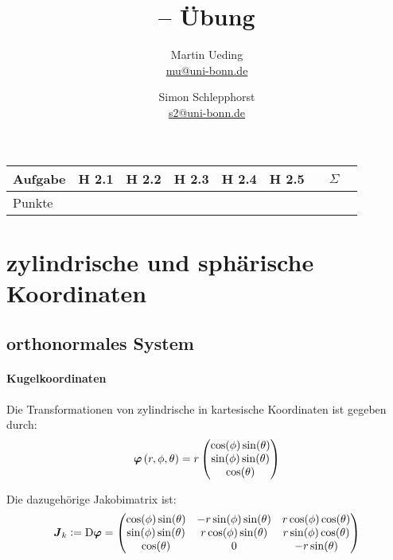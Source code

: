 \documentclass[11pt, ngerman]{article}
\title{\themodul{} -- Übung \theuebung \\ \vspace{0.5cm} \large{\thegruppe}}
\author{Martin Ueding \\ \small{\href{mailto:mu@uni-bonn.de}{mu@uni-bonn.de}} \and Simon Schlepphorst \\ \small{\href{mailto:s2@uni-bonn.de}{s2@uni-bonn.de}}}
\newcommand{\punkte}{\textcolor{white}{xxxxx}}
\newcommand{\tens}[1]{\boldsymbol{#1}}
\renewcommand{\vec}[1]{\boldsymbol{#1}}
\newcommand{\theuebung}{2}
\begin{document}
\maketitle

\begin{table}[h]
	\centering
	\begin{tabular}{l|c|c|c|c|c|c}
		Aufgabe & H \theuebung.1 & H \theuebung.2 & H \theuebung.3 & H \theuebung.4 & H \theuebung.5 & $\Sigma$   \\
		\hline
		Punkte & \punkte & \punkte & \punkte & \punkte & \punkte & \punkte
	\end{tabular}
\end{table}


\section{zylindrische und sphärische Koordinaten}

\subsection{orthonormales System}

\paragraph{Kugelkoordinaten}

Die Transformationen von zylindrische in kartesische Koordinaten ist gegeben durch:
\[
	\vec\varphi\del{r, \phi, \theta} = r \begin{pmatrix}
		\cos(\phi) \sin(\theta) \\
		\sin(\phi) \sin(\theta) \\
		\cos(\theta)
	\end{pmatrix}
\]

Die dazugehörige Jakobimatrix ist:
\[
	\tens J_k := \Dif \vec\varphi = \begin{pmatrix}
		\cos(\phi) \sin(\theta) & -r \sin(\phi)\sin(\theta) & r \cos(\phi) \cos(\theta) \\
		\sin(\phi) \sin(\theta) & r \cos(\phi)\sin(\theta) & r \sin(\phi)\cos(\theta) \\
						 \cos(\theta) & 0 & - r \sin(\theta)
	\end{pmatrix}
\]
\end{document}
